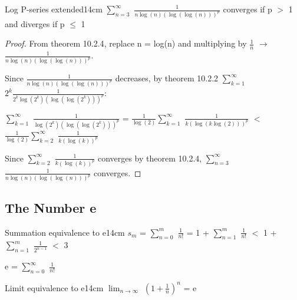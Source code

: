     \vspace{0.5cm}



    \begin{corollary}{Log P-series extended}{14cm}
        $\sum_{n=3}^{\infty}$ $\frac{1}{n\log(n)(\log(\log(n)))^p}$
        converges if p $>$ 1 and diverges if p $\leq$ 1
    \end{corollary}
    
    \begin{proof}
        From {\color{red} theorem 10.2.4}, replace n = log(n) and
        multiplying by $\frac{1}{n}$ $\rightarrow$
        $\frac{1}{n\log(n)(\log(\log(n)))^p}$.

        Since $\frac{1}{n\log(n)(\log(\log(n)))^p}$ decreases,
        by {\color{red} theorem 10.2.2}
        $\sum_{k=1}^{\infty}$ $2^k \frac{1}{2^k \log(2^k)(\log(\log(2^k)))^p}$:
        
        \hspace{1cm}
        $\sum_{k=1}^{\infty}$ $\frac{1}{\log(2^k)(\log(\log(2^k)))^p}$
        = $\frac{1}{\log(2)} \sum_{k=1}^{\infty}$ $\frac{1}{k (\log(k \log(2)))^p}$
        $<$ $\frac{1}{\log(2)} \sum_{k=2}^{\infty}$ $\frac{1}{k (\log(k))^p}$

        Since $\sum_{k=2}^{\infty}$ $\frac{1}{k (\log(k))^p}$ converges
        by {\color{red} theorem 10.2.4},
        $\sum_{n=3}^{\infty}$ $\frac{1}{n\log(n)(\log(\log(n)))^p}$ converges.
    \end{proof}

    \vspace{0.5cm}





\subsection{ The Number e}

    \begin{definition}{Summation equivalence to e}{14cm}
        $s_m$
        = $\sum_{n=0}^{m}$ $\frac{1}{n!}$
        = 1 + $\sum_{n=1}^{m}$ $\frac{1}{n!}$
        $<$ 1 + $\sum_{n=1}^{m}$ $\frac{1}{2^{n-1}}$
        $<$ 3

        e = $\sum_{n=0}^{\infty}$ $\frac{1}{n!}$
    \end{definition}

    \vspace{0.5cm}



    \begin{wtheorem}{Limit equivalence to e}{14cm}
        $\lim_{n \rightarrow \infty}$ $(1 + \frac{1}{n})^n$ = e
    \end{wtheorem}

